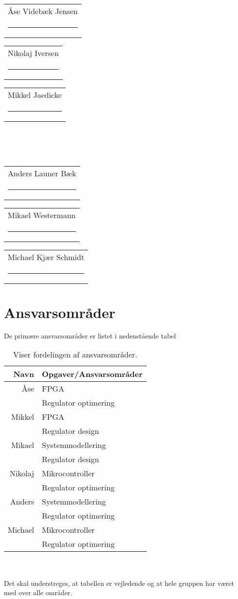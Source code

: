 



\vspace{3cm}
{
\newcommand{\namesigdate}[2][5cm]{%
  \begin{tabular}{@{}p{#1}@{}}
    #2 \\[2\normalbaselineskip] \hrule \\[0pt]
  \end{tabular}
}
\begin{changemargin}{-0cm}{-0cm}
\centering
\noindent \namesigdate[4.3cm]{Åse Videbæk Jensen} \hspace{1cm} \namesigdate[4.3cm]{Nikolaj Iversen} \hspace{1cm} \namesigdate[4.3cm]{Mikkel Jaedicke} \\~\\~\\
\centering
\noindent \namesigdate[4.3cm]{Anders Launer Bæk} \hspace{1cm}  \namesigdate[4.3cm]{Mikael Westermann} \hspace{1cm}   \namesigdate[4.3cm]{Michael Kjær Schmidt}
\end{changemargin}
}
\bigskip
\section*{Ansvarsområder}
De primære ansvarsområder er listet i nedenstående tabel
\bigskip
\begin{table}[!th]
\centering
\setlength{\extrarowheight}{5pt}
 \begin{tabular}{r|l}
Navn&Opgaver/Ansvarsområder \\[6pt] \hline
Åse&FPGA\\
&Regulator optimering\\[6pt] \hline
Mikkel& FPGA\\ 
& Regulator design\\[6pt] \hline
Mikael& Systemmodellering\\
&Regulator design\\[6pt] \hline
Nikolaj&Mikrocontroller\\
&Regulator optimering\\[6pt] \hline
Anders&Systemmodellering\\
&Regulator optimering\\[6pt] \hline
Michael &Mikrocontroller\\
&Regulator optimering\\ 
\end{tabular}     
\caption*{Viser fordelingen af ansvarsområder.}            
\end{table}\\~\\ 
Det skal understreges, at tabellen er vejledende og at hele gruppen har været med over alle områder.

